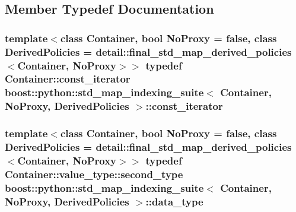 \subsection{\-Member \-Typedef \-Documentation}
\hypertarget{classboost_1_1python_1_1std__map__indexing__suite_aae0c4473455223a4e048cc207ca7b3ea}{
\subsubsection[{const\-\_\-iterator}]{\setlength{\rightskip}{0pt plus 5cm}template$<$class \-Container, bool \-No\-Proxy = false, class \-Derived\-Policies = detail\-::final\-\_\-std\-\_\-map\-\_\-derived\-\_\-policies$<$\-Container, No\-Proxy$>$$>$ typedef \-Container\-::const\-\_\-iterator {\bf boost\-::python\-::std\-\_\-map\-\_\-indexing\-\_\-suite}$<$ \-Container, \-No\-Proxy, \-Derived\-Policies $>$\-::{\bf const\-\_\-iterator}}}\label{classboost_1_1python_1_1std__map__indexing__suite_aae0c4473455223a4e048cc207ca7b3ea}
\hypertarget{classboost_1_1python_1_1std__map__indexing__suite_a3e9a6a8b8ba34759cf0ba99fe5966041}{
\subsubsection[{data\-\_\-type}]{\setlength{\rightskip}{0pt plus 5cm}template$<$class \-Container, bool \-No\-Proxy = false, class \-Derived\-Policies = detail\-::final\-\_\-std\-\_\-map\-\_\-derived\-\_\-policies$<$\-Container, No\-Proxy$>$$>$ typedef \-Container\-::value\-\_\-type\-::second\-\_\-type {\bf boost\-::python\-::std\-\_\-map\-\_\-indexing\-\_\-suite}$<$ \-Container, \-No\-Proxy, \-Derived\-Policies $>$\-::{\bf data\-\_\-type}}}\label{classboost_1_1python_1_1std__map__indexing__suite_a3e9a6a8b8ba34759cf0ba99fe5966041}

